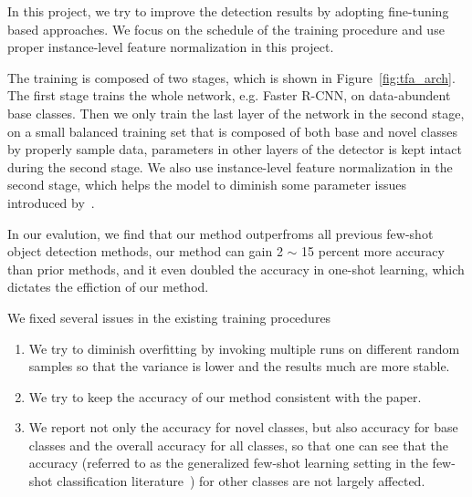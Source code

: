 In this project, we try to improve the detection results by adopting fine-tuning based approaches. We focus on the schedule of the training procedure and use proper instance-level feature normalization in this project.

The training is composed of two stages, which is shown in Figure~\ref{fig:tfa_arch}. The first stage trains the whole network, e.g. Faster R-CNN, on data-abundent base classes. Then we only train the last layer of the network in the second stage, on a small balanced training set that is composed of both base and novel classes by properly sample data, parameters in other layers of the detector is kept intact during the second stage. We also use instance-level feature normalization in the second stage, which helps the model to diminish some parameter issues introduced by~\citet{gidaris2018dynamic}.

In our evalution, we find that our method outperfroms all previous few-shot object detection methods, our method can gain 2 $\sim$ 15 percent more accuracy than prior methods, and it even doubled the accuracy in one-shot learning, which dictates the effiction of our method.

We fixed several issues in the existing training procedures
\begin{enumerate}
    \item We try to diminish overfitting by invoking multiple runs on different random samples so that the variance is lower and the results much are more stable.
    \item We try to keep the accuracy of our method consistent with the paper.
    \item We report not only the accuracy for novel classes, but also accuracy for base classes and the overall accuracy for all classes, so that one can see that the accuracy (referred to as the generalized few-shot learning setting in the few-shot classification literature~\cite{hariharan2017low,wang2019tafe}) for other classes are not largely affected.
\end{enumerate}
